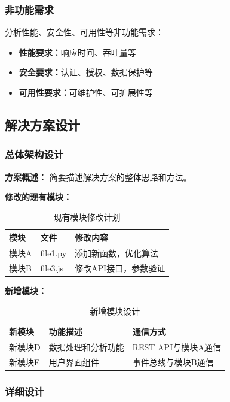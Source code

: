 \documentclass[a4paper,12pt]{article}
\begin{document}
\subsubsection{非功能需求}
分析性能、安全性、可用性等非功能需求：
\begin{itemize}
    \item \textbf{性能要求：}响应时间、吞吐量等
    \item \textbf{安全要求：}认证、授权、数据保护等
    \item \textbf{可用性要求：}可维护性、可扩展性等
\end{itemize}

\subsection{解决方案设计}

\subsubsection{总体架构设计}

\textbf{方案概述：}
简要描述解决方案的整体思路和方法。

\textbf{修改的现有模块：}
\begin{table}[H]
\centering
\begin{tabular}{|l|l|l|}
\hline
\textbf{模块} & \textbf{文件} & \textbf{修改内容} \\
\hline
模块A & file1.py & 添加新函数，优化算法 \\
\hline
模块B & file3.js & 修改API接口，参数验证 \\
\hline
\end{tabular}
\caption{现有模块修改计划}
\end{table}

\textbf{新增模块：}
\begin{table}[H]
\centering
\begin{tabular}{|l|l|l|}
\hline
\textbf{新模块} & \textbf{功能描述} & \textbf{通信方式} \\
\hline
新模块D & 数据处理和分析功能 & REST API与模块A通信 \\
\hline
新模块E & 用户界面组件 & 事件总线与模块B通信 \\
\hline
\end{tabular}
\caption{新增模块设计}
\end{table}

\subsubsection{详细设计}
\end{document}
